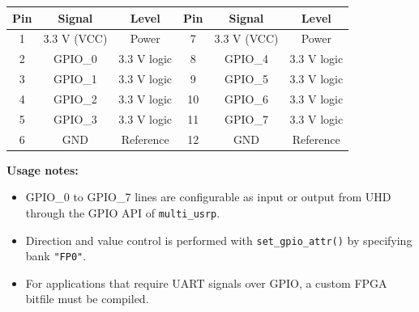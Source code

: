 \documentclass[11pt]{article}
\begin{document}
\begin{table}[h]
    \centering
    \begin{tabular}{ccc|ccc}
        \toprule
        \textbf{Pin} & \textbf{Signal} & \textbf{Level} & \textbf{Pin} & \textbf{Signal} & \textbf{Level} \\
        \midrule
        1 & 3.3 V (VCC) & Power & 7  & 3.3 V (VCC) & Power \\
        2 & GPIO\_0      & 3.3 V logic & 8  & GPIO\_4      & 3.3 V logic \\
        3 & GPIO\_1      & 3.3 V logic & 9  & GPIO\_5      & 3.3 V logic \\
        4 & GPIO\_2      & 3.3 V logic & 10 & GPIO\_6      & 3.3 V logic \\
        5 & GPIO\_3      & 3.3 V logic & 11 & GPIO\_7      & 3.3 V logic \\
        6 & GND          & Reference   & 12 & GND          & Reference \\
        \bottomrule
    \end{tabular}
\end{table}

\textbf{Usage notes:}
\begin{itemize}
    \item GPIO\_0 to GPIO\_7 lines are configurable as input or output from UHD through the GPIO API of \texttt{multi\_usrp}.
    \item Direction and value control is performed with \texttt{set\_gpio\_attr()} by specifying bank \texttt{"FP0"}.
    \item For applications that require UART signals over GPIO, a custom FPGA bitfile must be compiled.
\end{itemize}
\end{document}
